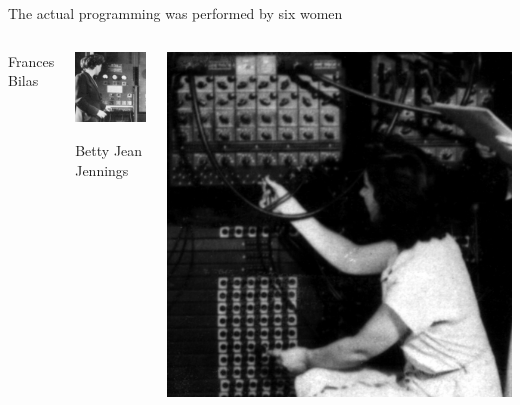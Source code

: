 \documentclass[aspectratio=169]{beamer}
\begin{document}
\begin{frame}{The actual programming was performed by six women}
\begin{columns}[t]
\begin{center}
Frances Bilas
\end{center}

\begin{center}
\includegraphics[width=\linewidth]{Betty-Jennings.jpg}

Betty Jean Jennings
\end{center}

\begin{center}
\includegraphics[width=\linewidth]{Ruth-Lichterman.jpg}


\end{center}
\end{columns}
\end{frame}
\end{document}
